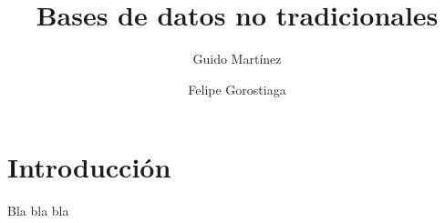 \documentclass[fleqn,a4paper,9pt]{book}
\author{Guido Martínez \and Felipe Gorostiaga}
\title{Bases de datos no tradicionales}
\begin{document}
\maketitle

\section{Introducción}

Bla bla bla
\end{document}
